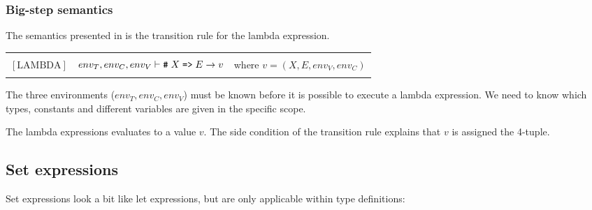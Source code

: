 \begin{ebnf}
\end{ebnf}

\todo{!!!!!!}

\subsubsection{Big-step semantics}

The semantics presented in  is the transition rule for the lambda expression. 

\begin{table}[ht]
  \begin{tabular*}{\textwidth}{l l c}
    \hline \\
    \hspace{0.5cm} $[\mbox{LAMBDA}]$ & $env_{T}, env_{C}, env_{V} \vdash \texttt{\#} \; X\;
    \texttt{=>}\; E \rightarrow v$ & \hspace{1cm} where $v = \left(X, E, env_{V}, env_{C}\right)$ \\
    & & \\
    \hline
  \end{tabular*}
  \label{semantic:lambda}
\end{table}

The three environments ($env_{T}, env_{C}, env_{V}$) must be known before it is
possible to execute a lambda expression. We need to know which types, constants
and different variables are given in the specific scope.

The lambda expressions evaluates to a value $v$. The side condition of the
transition rule explains that $v$ is assigned the 4-tuple.

\subsection{Set expressions}

Set expressions look a bit like let expressions, but are only applicable within type definitions:

\begin{ebnf}
\end{ebnf}

